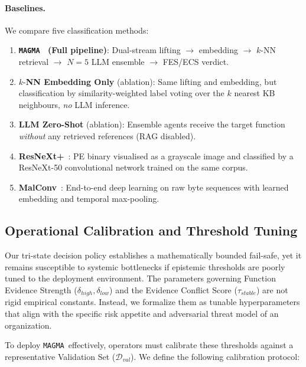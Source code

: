 \documentclass[pdflatex,sn-mathphys-num]{sn-jnl}
\newcommand{\sysname}{\texttt{MAGMA}~}
\begin{document}
\paragraph{Baselines.}
We compare five classification methods:
\begin{enumerate}
\item \textbf{\sysname{} (Full pipeline)}: Dual-stream lifting $\rightarrow$
    embedding $\rightarrow$ $k$-NN retrieval $\rightarrow$ $N{=}5$ LLM
    ensemble $\rightarrow$ FES/ECS verdict.
\item $k$-\textbf{NN Embedding Only} (ablation): Same lifting and embedding,
    but classification by similarity-weighted label voting over the $k$
    nearest KB neighbours, \emph{no} LLM inference.
\item \textbf{LLM Zero-Shot} (ablation): Ensemble agents receive the target
    function \emph{without} any retrieved references (RAG disabled).
\item \textbf{ResNeXt+}~\cite{HeYuewang2024ResNeXt}: PE binary visualised as a
    grayscale image and classified by a ResNeXt-50 convolutional network
    trained on the same corpus.
\item \textbf{MalConv}~\cite{RaffEdward2018Malware}: End-to-end deep learning on raw byte
    sequences with learned embedding and temporal max-pooling.
\end{enumerate}

\subsection{Operational Calibration and Threshold Tuning}
\label{sec:calibration}

Our tri-state decision policy establishes a mathematically bounded fail-safe, yet it remains susceptible to systemic bottlenecks if epistemic thresholds are poorly tuned to the deployment environment. The parameters governing Function Evidence Strength ($\delta_{high}, \delta_{low}$) and the Evidence Conflict Score ($\tau_{stable}$) are not rigid empirical constants. Instead, we formalize them as tunable hyperparameters that align with the specific risk appetite and adversarial threat model of an organization.

To deploy \sysname effectively, operators must calibrate these thresholds against a representative Validation Set ($\mathcal{D}_{val}$). We define the following calibration protocol:
\end{document}
